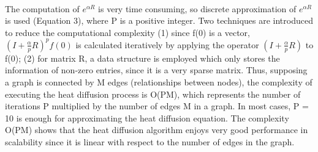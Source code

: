 \paragraph{}The computation of $e^{\alpha R}$ is very time consuming, so discrete approximation of $e^{\alpha R}$ is used (Equation 3), where P is a positive integer. Two techniques are introduced to reduce the computational complexity (1) since f(0) is a vector, $(I + \frac{\alpha}{p}R)^{p}f(0) $ is calculated iteratively by applying the operator $(I + \frac{\alpha}{p}R)$ to f(0); (2) for matrix R, a data structure is employed which only stores the information of non-zero entries, since it is a very sparse matrix. Thus, supposing a graph is connected by M edges (relationships between nodes), the complexity of executing the heat diffusion process is O(PM), which represents the number of iterations P multiplied by the number of edges M in a graph. In most cases, P = 10 is enough for approximating the heat diffusion equation. The complexity O(PM) shows that the heat diffusion algorithm enjoys very good performance in scalability since it is linear with respect to the number of edges in the graph.